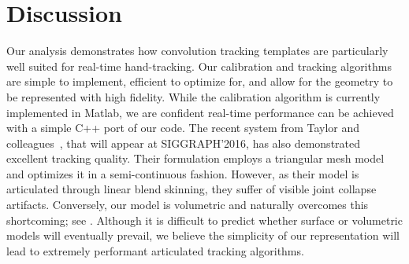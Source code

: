 \section{Discussion}
\label{sec:discussion}



Our analysis demonstrates how convolution tracking templates are particularly well suited for real-time hand-tracking. Our calibration and tracking algorithms are simple to implement, efficient to optimize for, and allow for the geometry to be represented with high fidelity. 
While the calibration algorithm is currently implemented in Matlab, we are confident real-time performance can be achieved with a simple C++ port of our code. 
% 
The recent system from Taylor and colleagues~\cite{taylor2016concerto}, that will appear at {SIGGRAPH'2016}, has also demonstrated excellent tracking quality. Their formulation employs a triangular mesh model and optimizes it in a semi-continuous fashion. However, as their model is articulated through linear blend skinning, they suffer of visible joint collapse artifacts. Conversely, our model is volumetric and naturally overcomes this shortcoming; see \VideoNoJointCollapse{}.
% 
Although it is difficult to predict whether surface or volumetric models will eventually prevail, we believe the simplicity of our representation will lead to extremely performant articulated tracking algorithms.

